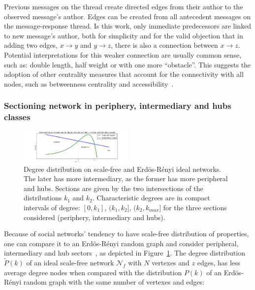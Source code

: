 \documentclass[%
 aip,
 jmp,%
 amsmath,amssymb,
 reprint,%
]{revtex4-1}
\begin{document}
Previous messages on the thread create directed edges from their author to the observed message's author. Edges can be created from all antecedent messages on the message-response thread. Is this work, only immediate predecessors are linked to new message's author, both for simplicity and for the valid objection that in adding two edges, $x\rightarrow y$ and $y\rightarrow z$, there is also a connection between $x\rightarrow z$. Potential interpretations for this weaker connection are usually common sense, such as: double length, half weight or with one more ``obstacle''. This suggests the adoption of other centrality measures that account for the connectivity with all nodes, such as betweenness centrality and accessibility~\cite{luMeasures,access}.


        \subsubsection{Sectioning network in periphery, intermediary and hubs classes}\label{sectioning}

\begin{figure}[hb]
    \centering
    \includegraphics[width=0.5\textwidth]{figs/fser}
    \caption{Degree distribution on scale-free and Erd\"os-R\'enyi ideal networks. The later has more
        intermediary, as the former has more peripheral and hubs. Sections are
        given by the two intersections of the distributions $k_1$ and $k_2$. Characteristic degrees
    are in compact intervals of degree: $[0,k_1]$, $(k_1,k_2]$, $(k_2,k_{max}]$ for the three sections considered (periphery, intermediary and hubs).}
    \label{fig:setores}
\end{figure}

Because of social networks' tendency to have scale-free distribution of properties,
one can compare it to an Erd\"os-R\'enyi random graph and consider peripheral, intermediary and hub
sectors~\cite{3setores}, as depicted in Figure~\ref{fig:setores}.
The degree distribution $\widetilde{P}(k)$ of an ideal
scale-free network $\mathcal{N}_f$ with $N$ vertexes and $z$ edges, has less
average degree nodes when compared with the distribution $P(k)$ of an Erd\"os-R\'enyi
random graph with the same number of vertexes and edges:
\end{document}
